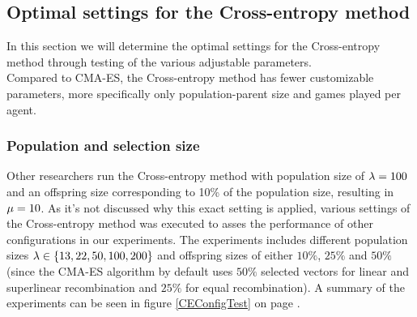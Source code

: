 \subsection{Optimal settings 
for the Cross-entropy method \label{optimalsettingsce}}

In this section we will determine the optimal settings for
the Cross-entropy method through testing
of the various adjustable parameters.\\
Compared to CMA-ES, the Cross-entropy method has fewer customizable parameters, more specifically 
only population-parent size and games played per agent.

\subsubsection{Population and selection size}
Other researchers run the Cross-entropy method with population size of
$\lambda = 100$ and an offspring size corresponding to 10\% of 
the population size, resulting in $\mu = 10$. As it's not 
discussed why this exact setting is applied, various settings of the Cross-entropy method
was executed to asses the performance of other configurations
in our experiments.
The experiments includes different population sizes 
$\lambda \in \{13, 22, 50, 100, 200\}$ and offspring 
sizes of either $10\%$, $25\%$ and $50\%$ (since the CMA-ES algorithm by default
uses $50 \%$ selected vectors for linear and superlinear 
recombination and $25\%$ for equal recombination). 
A summary of the experiments can be seen in figure \ref{CEConfigTest}
on page \pageref{CEConfigTest}.

